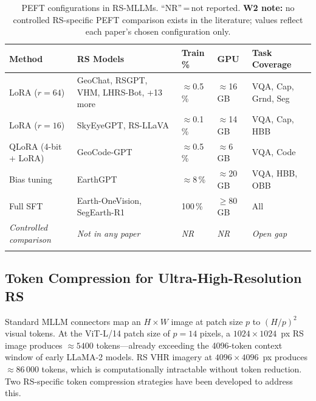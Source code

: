 \begin{table}[h]
\caption{PEFT configurations in RS-MLLMs. ``NR''\,=\,not reported.
\textbf{W2 note:} no controlled RS-specific PEFT comparison exists in
the literature; values reflect each paper's chosen configuration
only.}\label{tab:peft_summary}
\tiny\setlength\tabcolsep{2pt}
\begin{tabular}{p{1.7cm}p{2.6cm}p{0.9cm}p{0.9cm}p{2.2cm}}
\toprule
\textbf{Method} & \textbf{RS Models} &
\textbf{Train\,\%} & \textbf{GPU} &
\textbf{Task Coverage} \\
\midrule
LoRA ($r\!=\!64$)
  & GeoChat, RSGPT, VHM, LHRS-Bot, +13 more
  & $\approx$0.5\,\%
  & $\approx$16\,GB
  & VQA, Cap, Grnd, Seg \\[2pt]
LoRA ($r\!=\!16$)
  & SkyEyeGPT, RS-LLaVA
  & $\approx$0.1\,\%
  & $\approx$14\,GB
  & VQA, Cap, HBB \\[2pt]
QLoRA (4-bit + LoRA)
  & GeoCode-GPT
  & $\approx$0.5\,\%
  & $\approx$6\,GB
  & VQA, Code \\[2pt]
Bias tuning
  & EarthGPT
  & $\approx$8\,\%
  & $\approx$20\,GB
  & VQA, HBB, OBB \\[2pt]
Full SFT
  & Earth-OneVision, SegEarth-R1
  & 100\,\%
  & $\geq$80\,GB
  & All \\[2pt]
\midrule
\textit{Controlled comparison}
  & \textit{Not in any paper}
  & \textit{NR}
  & \textit{NR}
  & \textit{Open gap} \\
\botrule
\end{tabular}
\end{table}

\subsection{Token Compression for Ultra-High-Resolution RS}\label{sec6:uhr}

Standard MLLM connectors map an $H\!\times\!W$ image at patch size $p$ to
$(H/p)^2$ visual tokens. At the ViT-L/14 patch size of $p\!=\!14$ pixels,
a $1024\!\times\!1024$~px RS image produces $\approx\!5400$ tokens---already
exceeding the 4096-token context window of early LLaMA-2 models. RS VHR
imagery at $4096\!\times\!4096$~px produces $\approx\!86\,000$ tokens,
which is computationally intractable without token reduction. Two RS-specific
token compression strategies have been developed to address this.

